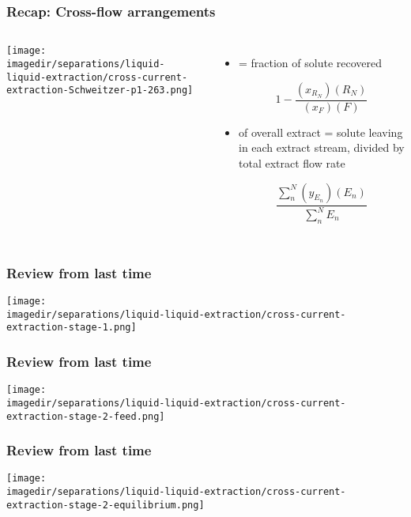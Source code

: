 \begin{frame}\frametitle{Recap: {\color{myOrange}Cross-flow arrangements}}
	\begin{columns}[t]
			\begin{center}
				\vspace{-12pt}
				{\color{myGreen}{$N=3$ in this illustration}}
				\texttt{[image: \\imagedir/separations/liquid-liquid-extraction/cross-current-extraction-Schweitzer-p1-263.png]}
			\end{center}
			\begin{itemize}
				\item	{\color{purple}{Recovery}} = fraction of solute recovered
					\begin{exampleblock}{}
						\[1 - \displaystyle\frac{(x_{R_N})(R_N)}{(x_F) (F)}\]
					\end{exampleblock}

				\vspace{6pt}
				\item	{\color{purple}{Concentration}} of overall extract = solute leaving in each extract stream, divided by total extract flow rate
					\begin{exampleblock}{}
						\[\frac{\displaystyle \sum_n^N{(y_{E_n})(E_n)}}{ \displaystyle \sum_n^N{E_n}}\]
					\end{exampleblock}
			\end{itemize}
	\end{columns}
\end{frame}

\begin{frame}\frametitle{Review from last time}
	\begin{center}
		\texttt{[image: \\imagedir/separations/liquid-liquid-extraction/cross-current-extraction-stage-1.png]}
	\end{center}
\end{frame}

\begin{frame}\frametitle{Review from last time}
	\begin{center}
		\texttt{[image: \\imagedir/separations/liquid-liquid-extraction/cross-current-extraction-stage-2-feed.png]}
	\end{center}
\end{frame}

\begin{frame}\frametitle{Review from last time}
	\begin{center}
		\texttt{[image: \\imagedir/separations/liquid-liquid-extraction/cross-current-extraction-stage-2-equilibrium.png]}
	\end{center}
\end{frame}

